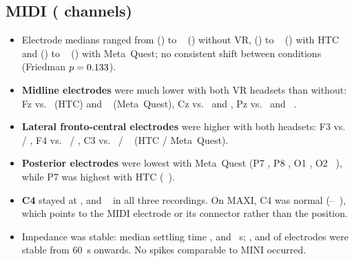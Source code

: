 \documentclass[11pt,a4paper]{article}
\begin{document}
\subsection{MIDI (\impMIDINChannels{} channels)}
\begin{itemize}
  \item Electrode medians ranged from \impMIDIMedMinNoVR{} (\impMIDIMedMinChNoVR) to
    \impMIDIMedMaxNoVR~\impUnit{} (\impMIDIMedMaxChNoVR) without VR,
    \impMIDIMedMinHTC{} (\impMIDIMedMinChHTC) to \impMIDIMedMaxHTC~\impUnit{}
    (\impMIDIMedMaxChHTC) with HTC and \impMIDIMedMinMetaQuest{}
    (\impMIDIMedMinChMetaQuest) to \impMIDIMedMaxMetaQuest~\impUnit{}
    (\impMIDIMedMaxChMetaQuest) with Meta~Quest; no consistent shift between
    conditions (Friedman \(p = 0.133\)).
  \item \textbf{Midline electrodes} were much lower with both VR headsets than
    without: Fz \impMIDIMedFzNoVR{} vs.\ \impMIDIMedFzHTC{} (HTC) and
    \impMIDIMedFzMetaQuest~\impUnit{} (Meta~Quest), Cz \impMIDIMedCzNoVR{} vs.\
    \impMIDIMedCzHTC{} and \impMIDIMedCzMetaQuest, Pz \impMIDIMedPzNoVR{} vs.\
    \impMIDIMedPzHTC{} and \impMIDIMedPzMetaQuest~\impUnit.
  \item \textbf{Lateral fronto-central electrodes} were higher with both
    headsets: F3 \impMIDIMedFthreeNoVR{} vs.\ \impMIDIMedFthreeHTC{} /
    \impMIDIMedFthreeMetaQuest, F4 \impMIDIMedFfourNoVR{} vs.\
    \impMIDIMedFfourHTC{} / \impMIDIMedFfourMetaQuest, C3
    \impMIDIMedCthreeNoVR{} vs.\ \impMIDIMedCthreeHTC{} /
    \impMIDIMedCthreeMetaQuest~\impUnit{} (HTC / Meta~Quest).
  \item \textbf{Posterior electrodes} were lowest with Meta~Quest (P7
    \impMIDIMedPsevenMetaQuest, P8 \impMIDIMedPeightMetaQuest, O1
    \impMIDIMedOoneMetaQuest, O2 \impMIDIMedOtwoMetaQuest~\impUnit), while P7
    was highest with HTC (\impMIDIMedPsevenHTC~\impUnit).
  \item \textbf{C4} stayed at \impMIDIMedCfourNoVR, \impMIDIMedCfourHTC{} and
    \impMIDIMedCfourMetaQuest~\impUnit{} in all three recordings. On MAXI,
    C4 was normal (\impMAXIMedCfourNoVR--\impMAXIMedCfourMetaQuest~\impUnit),
    which points to the MIDI electrode or its connector rather than the position.
  \item Impedance was stable: median settling time \impMIDISettleMedNoVR,
    \impMIDISettleMedHTC{} and \impMIDISettleMedMetaQuest~s;
    \impMIDINSettledSixtyNoVR, \impMIDINSettledSixtyHTC{} and
    \impMIDINSettledSixtyMetaQuest{} of \impMIDINChannels{} electrodes were
    stable from 60~s onwards. No spikes comparable to MINI occurred.
\end{itemize}
\end{document}
